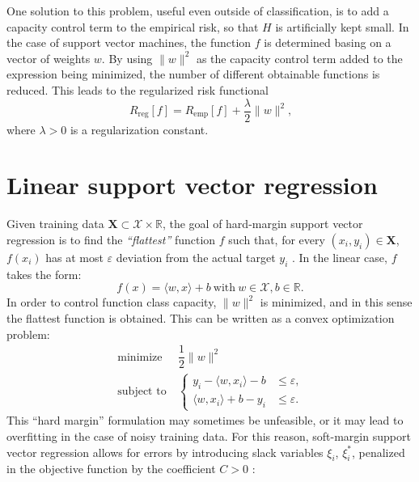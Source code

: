 \documentclass[12pt]{report}
\begin{document}
One solution to this problem, useful even outside of classification, is to add a capacity control term to the empirical risk, so that $ H $ is artificially kept small. In the case of support vector machines, the function $ f $ is determined basing on a vector of weights $ w $. By using $ \| w \|^2 $ as the capacity control term added to the expression being minimized, the number of different obtainable functions is reduced. This leads to the regularized risk functional \cite{tikhonov77}
\begin{equation} \label{regriskfun}
R_{\text{reg}}[f] = R_{\text{emp}}[f] + \dfrac{\lambda}{2}\| w \|^2 \text{,}
\end{equation}
where $ \lambda > 0 $ is a regularization constant.

\section{Linear support vector regression}
Given training data $ \mathbf{X} \subset \mathcal{X} \times \mathbb{R} $, the goal of hard-margin support vector regression is to find the \textit{``flattest''} function $ f $ such that, for every $ (x_{i},y_{i}) \in \mathbf{X} $, $ f(x_{i}) $ has at most $ \varepsilon $ deviation from the actual target $ y_{i} $ \cite{vapnik95}. In the linear case, $ f $ takes the form:
\begin{equation} \label{linfun}
f(x) = \langle w,x \rangle + b \ \text{with} \ w \in \mathcal{X}, b \in \mathbb{R} \text{.}
\end{equation}
In order to control function class capacity, $ \| w \|^2 $ is minimized, and in this sense the flattest function is obtained. This can be written as a convex optimization problem:
\begin{equation} \label{hmargprimal}
\begin{split}
\text{minimize} &\ \dfrac{1}{2}\| w \|^2 \\
\text{subject to} &\ \begin{cases}
y_{i} - \langle w,x_{i} \rangle - b &\leq \varepsilon \text{,}\\
\langle w,x_{i} \rangle + b - y_{i} &\leq \varepsilon \text{.}
\end{cases}
\end{split}
\end{equation}
This ``hard margin'' formulation may sometimes be unfeasible, or it may lead to overfitting in the case of noisy training data. For this reason, soft-margin support vector regression allows for errors by introducing slack variables $ \xi_{i} $, $ \xi_{i}^{*} $, penalized in the objective function by the coefficient $ C > 0 $ \cite{cortes95}:
\end{document}

